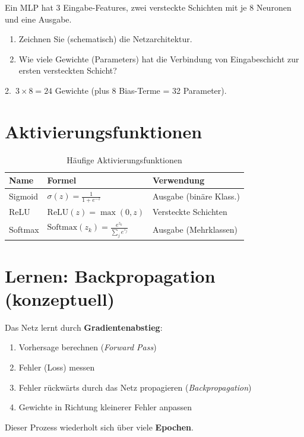 \begin{myexercise}
Ein MLP hat 3 Eingabe-Features, zwei versteckte Schichten mit je 8 Neuronen
und eine Ausgabe.
\begin{enumerate}
    \item Zeichnen Sie (schematisch) die Netzarchitektur.
    \item Wie viele Gewichte (Parameters) hat die Verbindung von Eingabeschicht zur ersten
          versteckten Schicht?
\end{enumerate}
\begin{myanswer}
2.\ $3 \times 8 = 24$ Gewichte (plus 8 Bias-Terme = 32 Parameter).
\end{myanswer}
\end{myexercise}

\section{Aktivierungsfunktionen}

\begin{table}[H]
\centering
\small
\begin{tabular}{p{2.8cm}p{4.2cm}p{4.2cm}}
\toprule
\textbf{Name} & \textbf{Formel} & \textbf{Verwendung} \\
\midrule
Sigmoid & $\sigma(z) = \frac{1}{1+e^{-z}}$ & Ausgabe (binäre Klass.) \\
ReLU & $\text{ReLU}(z) = \max(0, z)$ & Versteckte Schichten \\
Softmax & $\text{Softmax}(z_k) = \frac{e^{z_k}}{\sum_j e^{z_j}}$ & Ausgabe (Mehrklassen) \\
\bottomrule
\end{tabular}
\caption{Häufige Aktivierungsfunktionen}
\label{tab:aktivierung-15}
\end{table}

\section{Lernen: Backpropagation (konzeptuell)}

\begin{mydefinition}[Backpropagation]
Das Netz lernt durch \textbf{Gradientenabstieg}:
\begin{enumerate}
    \item Vorhersage berechnen (\emph{Forward Pass})
    \item Fehler (Loss) messen
    \item Fehler rückwärts durch das Netz propagieren (\emph{Backpropagation})
    \item Gewichte in Richtung kleinerer Fehler anpassen
\end{enumerate}
Dieser Prozess wiederholt sich über viele \textbf{Epochen}.
\end{mydefinition}

